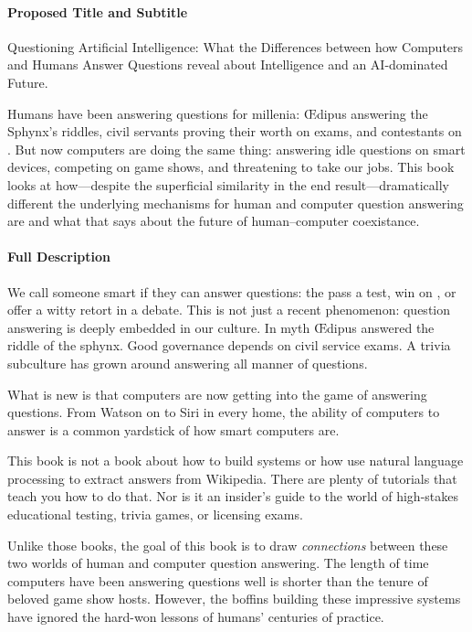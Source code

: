 
\paragraph{Proposed Title and Subtitle}

Questioning Artificial Intelligence: What the Differences between how
Computers and Humans Answer Questions reveal about Intelligence and an
AI-dominated Future.

Humans have been answering questions for millenia: \OE{}dipus answering the
Sphynx's riddles, civil servants proving their worth on exams, and contestants
on \jeopardyp{}.
%
But now computers are doing the same thing: answering idle questions on smart
devices, competing on game shows, and threatening to take our jobs.
%
This book looks at how---despite the superficial similarity in the end
result---dramatically different the underlying mechanisms for human and
computer question answering are and what that says about the future of
human--computer coexistance.

\paragraph{Full Description}

We call someone smart if they can answer questions: the pass a test, win
on \jeopardyp{}, or offer a witty retort in a debate.
%
This is not just a recent phenomenon: question answering is deeply embedded in
our culture.
%
In myth \OE{}dipus answered the riddle of the sphynx.
%
Good governance depends on civil service exams.
%
A trivia subculture has grown around answering all manner of questions.

What is new is that computers are now getting into the game of answering
questions.
%
From  Watson on \jeopardy{} to Siri in every home, the ability of
computers to answer is a common yardstick of how smart computers are.

This book is not a book about how to build  systems or how use natural
language processing to extract answers from Wikipedia.
%
There are plenty of tutorials that teach you how to do that.
%
Nor is it an insider's guide to the world of high-stakes educational testing,
trivia games, or licensing exams.

Unlike those books, the goal of this book is to draw \emph{connections}
between these two worlds of human and computer question answering.
%
The length of time computers have been answering questions well is shorter
than the tenure of beloved game show hosts.
%
However, the  boffins building these impressive systems have ignored
the hard-won lessons of humans' centuries of practice.

